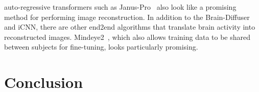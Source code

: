 auto-regressive transformers such as Janus-Pro~\cite{chenJanusproUnifiedMultimodal2025} also look like a promising method for performing image reconstruction. In addition to the Brain-Diffuser and iCNN, there are other end2end algorithms that translate brain activity into reconstructed images. Mindeye2~\cite{scottiMindEye2SharedSubjectModels2024}, which also allows training data to be shared between subjects for fine-tuning, looks particularly promising.


\section{Conclusion}


